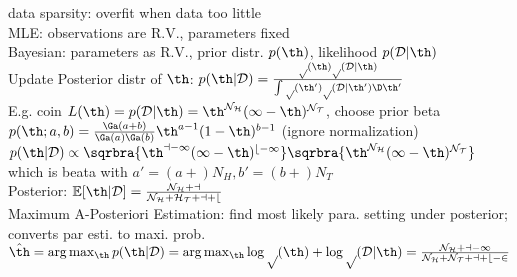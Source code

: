 \documentclass[10pt]{CheatSheet/hw}
\begin{document}
\begin{multicols*}{5}
data sparsity: overfit when data too little\\
MLE: observations are R.V., parameters fixed\\
Bayesian: parameters as R.V., prior distr. $p(\th)$, likelihood $p(\cal{D}|\th)$\\
Update Posterior distr of $\th$: $p(\th|\cal{D})=\frac{p(\th) p(\cal{D}|\th)}{\int p(\th')p(\cal{D}|\th')\D \th'}$\\
E.g. coin $L(\th)=p(\cal{D}|\th)=\th^{N_H}(1-\th)^{N_T}$, choose prior beta $p(\th; a,b)=\frac{\Ga(a+b)}{\Ga(a)\Ga(b)}\th^{a-1}(1-\th)^{b-1}$ (ignore normalization)\\
$p(\th|\cal{D})\propto \sqrbra{\th^{a-1}(1-\th)^{b-1}}\sqrbra{\th^{N_H}(1-\th)^{N_T}}$\\
which is beata with $a'=(a+)N_H, b'=(b+)N_T$\\
Posterior: $\mathbb{E}[\th|\cal{D}]=\frac{N_H+a}{N_H+H_T+a+b}$\\
Maximum A-Posteriori Estimation: find most likely para. setting under posterior; converts par esti. to maxi. prob.\\
$\hat{\th}=\arg \max_\th p(\th | \cal{D})=\arg \max_\th \log p(\th) + \log p(\cal{D}|\th)=\frac{N_H+a-1}{N_H+N_T+a+b-2}$
\end{multicols*}
\end{document}

